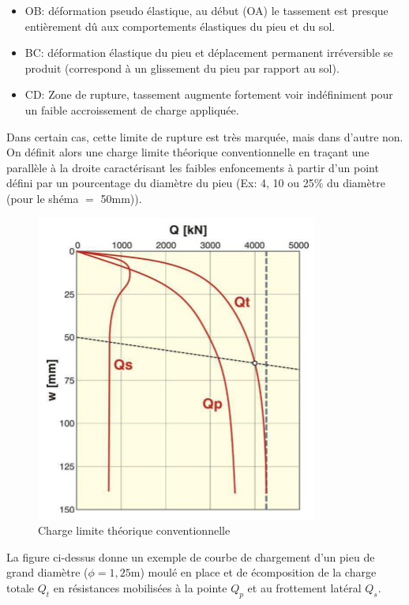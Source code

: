         \begin{itemize}
            \item OB: déformation pseudo élastique, au début (OA) le tassement est presque entièrement dû aux comportements élastiques du pieu et du sol.
            \item BC: déformation élastique du pieu et déplacement permanent irréversible se produit (correspond à un glissement du pieu par rapport au sol).
            \item CD: Zone de rupture, tassement augmente fortement voir indéfiniment pour un faible accroissement de charge appliquée.
        \end{itemize} 
        
        Dans certain cas, cette limite de rupture est très marquée, mais dans d'autre non. On définit alors une charge limite théorique conventionnelle en traçant une parallèle  à la droite caractérisant les faibles enfoncements à partir d'un point défini par un pourcentage du diamètre du pieu (Ex: 4, 10 ou 25\% du diamètre (pour le shéma $=$ 50mm)).
        
        \begin{figure}[h!]
            \centering
            \includegraphics[scale=0.6]{Holeyman/images/H37.PNG}
            \caption{ Charge limite théorique conventionnelle }
        \end{figure}
        
        La figure ci-dessus donne un exemple de courbe de chargement d'un pieu de grand diamètre ($\phi = 1,25$m) moulé en place et de écomposition de la charge totale $Q_t$ en résistances mobilisées à la pointe $Q_p$ et au frottement latéral $Q_s$.
        
